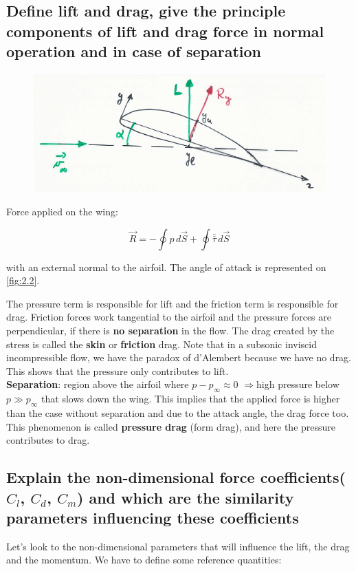 \documentclass[british,french,11pt, a4paper, openany]{article}
\begin{document}
\subsection{Define lift and drag, give the principle components of lift and drag force in normal operation and in case of separation}
	
\begin{figure}
	\vspace{-5mm}
	\includegraphics[scale=0.25]{ch2/3}
	\label{fig:2.2}
\end{figure}
Force applied on the wing:

\begin{equation}
\vec{R} = -\oint p \, d\vec{S} + \oint \bar{\bar{\tau}} \, d\vec{S} 
\end{equation}

with an external normal to the airfoil. The angle of attack is represented on \autoref{fig:2.2}.

The pressure term is responsible for lift and the friction term is responsible for drag. Friction forces work tangential to the airfoil and the pressure forces are perpendicular, if there is \textbf{no separation} in the flow. The drag created by the stress is called the \textbf{skin} or \textbf{friction} drag. 
Note that in a subsonic inviscid incompressible flow, we have the paradox of d’Alembert because we have no drag. This shows that the pressure only contributes to lift. \\

\textbf{Separation}: region above the airfoil where $p-p_\infty \approx 0$ $\Rightarrow$high pressure below $p\gg p_\infty$ that slows down the wing. This implies that the applied force is higher than the case without separation and due to the attack angle, the drag force too. This phenomenon is called \textbf{pressure drag} (form drag), and here the pressure contributes to drag.


\subsection{Explain the non-dimensional force coefficients($C_l$, $C_d$, $C_m$) and which are the similarity parameters influencing these coefficients}
Let’s look to the non-dimensional parameters that will influence the lift, the drag and the momentum. We have to define some reference quantities: 
\end{document}
